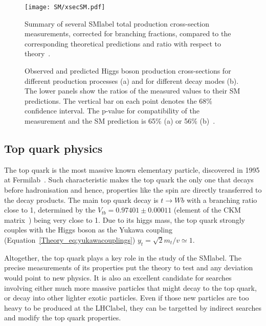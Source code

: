 \begin{figure}[htbp]
    \RawFloats
    \begin{center}
    \texttt{[image: SM/xsecSM.pdf]}
    \caption{
        Summary of several \acrshort{SMlabel} total production cross-section measurements, corrected for branching fractions, compared to the corresponding theoretical predictions and ratio with respect to theory~\cite{ATL-PHYS-PUB-2021-032}. 
    }
    \label{figSM:xsecSM}
    \end{center}
\end{figure}

\begin{figure}[htbp]
    \RawFloats
    \begin{center}
        \quad
        \caption{
            Observed and predicted Higgs boson production cross-sections for different production processes (a) and for different decay modes (b). The lower panels show the ratios of the measured values to their SM predictions. The vertical bar on each point denotes the 68\% confidence interval. The p-value for compatibility of the measurement and the SM prediction is 65\% (a) or 56\% (b)~\cite{HiggssumaryAtlas2022}. 
    }
    \label{figSM:xsecBRH}
    \end{center}
\end{figure}

\clearpage
\subsection{Top quark physics}

The top quark is the most massive known elementary particle, discovered in 1995 at Fermilab~\cite{topsearch1995,PhysRevLett.74.2626}. Such characteristic makes the top quark the only one that decays before hadronisation and hence, properties like the spin are directly transferred to the decay products. The main top quark decay is $t\to Wb$ with a branching ratio close to 1, determined by the $V_{tb}=0.97401 \pm 0.00011$ (element of the CKM matrix~\cite{pdg}) being very close to 1. Due to its higgs mass, the top quark strongly couples with the Higgs boson as the Yukawa coupling (Equation~\ref{Theory_eq:yukawacouplings}) $y_t=\sqrt{2}m_t/v\simeq 1$.

Altogether, the top quark plays a key role in the study of the \acrshort{SMlabel}. The precise measurements of its properties put the theory to test and any deviation would point to new physics. It is also an excellent candidate for searches involving either much more massive particles that might decay to the top quark, or decay into other lighter exotic particles. Even if those new particles are too heavy to be produced at the \acrshort{LHClabel}, they can be targetted by indirect searches and modify the top quark properties.

